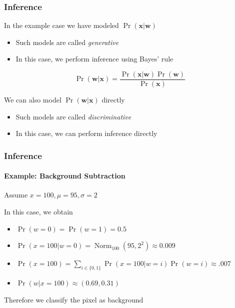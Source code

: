\documentclass[xetex,professionalfont]{beamer}
\DeclareMathOperator*{\Norm}{Norm}
\renewcommand{\vec}[1]{\ensuremath{\mathbf{#1}}}
\newcommand{\vw}{\vec{w}}
\newcommand{\vx}{\vec{x}}
\begin{document}
\begin{frame}
\frametitle{Inference}

In the example case we have modeled $\Pr(\vx|\vw)$ %
\begin{itemize}
     \item Such models are called \emph{generative}
     \item In this case, we perform inference using Bayes' rule
 \end{itemize}

\[\Pr(\vw|\vx)=\frac{\Pr(\vx|\vw)\Pr(\vw)}{\Pr(\vx)}\] %

\bigskip
We can also model $\Pr(\vw|\vx)$ directly %
\begin{itemize}
    \item Such models are called \emph{discriminative}
    \item In this case, we can perform inference directly
\end{itemize}

\end{frame}


\begin{frame}
\frametitle{Inference}
\framesubtitle{Example: Background Subtraction}

Assume $x=100, \mu=95, \sigma=2$ %

\bigskip
In this case, we obtain
\begin{itemize}
    \item $\Pr(w=0)=\Pr(w=1)=0.5$
    \item $\Pr(x=100|w=0)=\Norm_{100}(95,2^2)\approx0.009$
    \item $\Pr(x=100)=\sum_{i\in\{0,1\}}\Pr(x=100|w=i)\Pr(w=i)\approx .007$
    \item $\Pr(w|x=100)\approx(0.69,0.31)$
\end{itemize}

\bigskip
Therefore we classify the pixel as background %

\end{frame}
\end{document}
